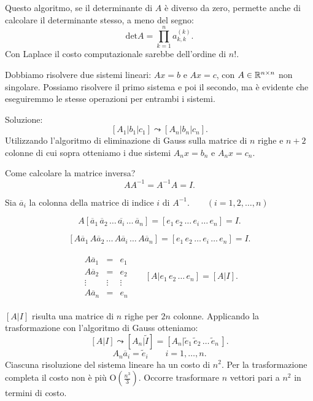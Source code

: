 \begin{osse}
\label{gauss-determinante}
Questo algoritmo, se il determinante di $A$ è diverso da zero, permette anche
di calcolare il determinante stesso, a meno del segno:
\[ \textrm{det}A = \prod_{k=1}^na_{k,k}^{(k)}.
\]
Con Laplace il costo computazionale sarebbe dell'ordine di $n!$.
\end{osse}
\begin{osse}
\label{Gauss-inline}
Dobbiamo risolvere due sistemi lineari: $Ax = b$ e $Ax = c$, con $A \in
\mathbb{R}^{n\times n}$ non singolare. Possiamo risolvere il primo sistema e poi il
secondo, ma è evidente che eseguiremmo le stesse operazioni per entrambi
i sistemi.

Soluzione:
\[[A_1|b_1|c_1] \leadsto [A_n|b_n|c_n].\]
Utilizzando l'algoritmo di eliminazione di Gauss sulla matrice di $n$ righe e
$n+2$ colonne di cui sopra otteniamo i due sistemi $A_nx = b_n$ e
$A_nx = c_n$.
\end{osse}
\begin{osse}
Come calcolare la matrice inversa?
\[A A^{-1} = A^{-1} A = I.\]

Sia $\overline{a}_i$ la colonna della matrice di indice $i$ di
$A^{-1}. \qquad (i = 1, 2, \ldots , n)$

\[
A[\overline{a}_1\, \overline{a}_2\, \ldots\, \overline{a_{i}}\, \ldots\,
\overline{a}_n] = [e_1\, e_2\, \ldots\, e_i\, \ldots\, e_n] = I.\]

\[[A\overline{a}_1\, A\overline{a}_2\, \ldots\, A\overline{a}_i\, \ldots
\,
A\overline{a}_n] = [e_1\, e_2\, \ldots\, e_i\, \ldots\, e_n] = I.\]

\[
\begin{array}{ccc}\begin{array}{ccc}
A\overline{a}_1& = & e_1 \\
A\overline{a}_2 & = & e_2 \\
\vdots & \vdots & \vdots \\
A\overline{a}_n & = & e_n
\end{array} & & [A|e_1\, e_2\, \ldots\, e_n] = [A|I].
 \end{array}
\]

$[A|I]$ risulta una matrice di $n$ righe per $2n$ colonne.
Applicando la trasformazione con l'algoritmo di Gauss otteniamo:
\[
[A|I] \leadsto [A_n|\tilde{I}] = [A_n | \tilde{e}_1\, \tilde{e}_2\, \ldots\,
\tilde{e}_n\,].
\]
\[
A_n\overline{a}_i = \tilde{e}_i \qquad i = 1, \ldots, n.
\]
Ciascuna risoluzione del sistema lineare ha un costo di $n^2$. Per la
trasformazione completa il costo non è più O$(\frac{n^3}{3})$. Occorre
trasformare $n$ vettori pari a $n^2$ in termini di costo.
\end{osse}

